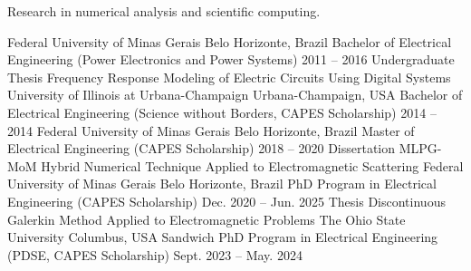 \documentclass{cv}
\begin{document}
\makeprofileheader

\begin{Objective}
    Research in numerical analysis and scientific computing.
\end{Objective}

\begin{Education}
    \educationitem
    {Federal University of Minas Gerais}
    {Belo Horizonte, Brazil}
    {Bachelor of Electrical Engineering (Power Electronics and Power Systems)}
    {2011 -- 2016}
    {Undergraduate Thesis}
    {Frequency Response Modeling of Electric Circuits Using Digital Systems}
    \educationitem
    {University of Illinois at Urbana-Champaign}
    {Urbana-Champaign, USA}
    {Bachelor of Electrical Engineering (Science without Borders,
    CAPES Scholarship)}
    {2014 -- 2014}
    {}
    {}
    \educationitem
    {Federal University of Minas Gerais}
    {Belo Horizonte, Brazil}
    {Master of Electrical Engineering (CAPES Scholarship)}
    {2018 -- 2020}
    {Dissertation}
    {MLPG-MoM Hybrid Numerical Technique Applied to Electromagnetic Scattering}
    \educationitem
    {Federal University of Minas Gerais}
    {Belo Horizonte, Brazil}
    {PhD Program in Electrical Engineering (CAPES Scholarship)}
    {Dec. 2020 -- Jun. 2025}
    {Thesis}
    {Discontinuous Galerkin Method Applied to Electromagnetic Problems}
    \educationitem
    {The Ohio State University}
    {Columbus, USA}
    {Sandwich PhD Program in Electrical Engineering (PDSE, CAPES Scholarship)}
    {Sept. 2023 -- May. 2024}
    {}
    {}
\end{Education}

\begin{Experience}
\end{Experience}
\end{document}
